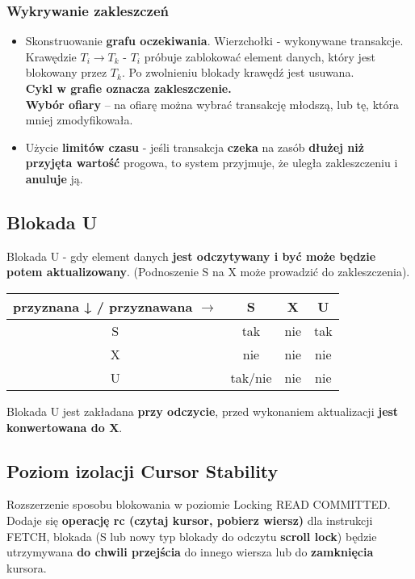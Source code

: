 \documentclass[a4paper]{article}
\begin{document}
\subsubsection{Wykrywanie zakleszczeń}
\begin{itemize}
    \item Skonstruowanie	 \textbf{grafu	 oczekiwania}. Wierzchołki - wykonywane transakcje. Krawędzie $T_i \rightarrow T_k$ - $T_i$ próbuje	zablokować	element	danych, który jest blokowany	 przez	$T_k$. Po zwolnieniu	blokady	krawędź	jest	usuwana.\\
    \textbf{Cykl	w	grafie	oznacza	zakleszczenie.}\\
    \textbf{Wybór	 ofiary}	 – na	 ofiarę	 można	 wybrać	 transakcję	 młodszą,	 lub	 tę,	 która	 mniej zmodyfikowała.	
    \item Użycie \textbf{limitów	czasu} - jeśli	transakcja	\textbf{czeka}	na	zasób	\textbf{dłużej	niż	przyjęta wartość}	progowa,	 to	 system	 przyjmuje,	 że	 uległa	 zakleszczeniu	 i	\textbf{anuluje}	ją.
\end{itemize}

\subsection{Blokada U}
Blokada	U - gdy element	danych	\textbf{jest odczytywany i być	może będzie	potem aktualizowany}. (Podnoszenie S na X może prowadzić do zakleszczenia).\\
\begin{tabular}{|c|c|c|c|}
\hline
    przyznana ↓ / przyznawana $\rightarrow$ & S & X & U \\
\hline
    S & tak & nie & tak\\
\hline
    X & nie & nie & nie\\
\hline
    U & tak/nie & nie & nie\\
\hline
\end{tabular}

Blokada	U	jest	zakładana	\textbf{przy odczycie}, przed	wykonaniem	aktualizacji \textbf{jest konwertowana do X}.

\subsection{Poziom izolacji Cursor Stability}
 Rozszerzenie sposobu blokowania w poziomie Locking READ COMMITTED. Dodaje się \textbf{operację rc (czytaj kursor,
pobierz wiersz)} dla instrukcji FETCH, blokada (S lub nowy typ blokady do odczytu \textbf{scroll lock}) będzie utrzymywana \textbf{do chwili przejścia} do innego wiersza lub do \textbf{zamknięcia} kursora.\\
\end{document}
